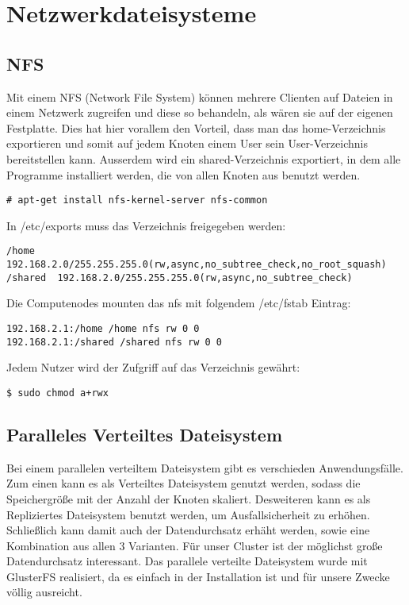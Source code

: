 \chapter{Netzwerkdateisysteme}
\section{NFS}
Mit einem NFS (Network File System) können mehrere Clienten auf Dateien
in einem Netzwerk zugreifen und diese so behandeln, als wären sie
auf der eigenen Festplatte.
Dies hat hier vorallem den Vorteil, dass man das home-Verzeichnis
exportieren und somit auf jedem Knoten einem User sein User-Verzeichnis
bereitstellen kann. Ausserdem wird ein shared-Verzeichnis exportiert, in dem 
alle Programme installiert werden, die von allen Knoten aus benutzt werden.
\begin{lstlisting}[style=Bash]
# apt-get install nfs-kernel-server nfs-common
\end{lstlisting}
In /etc/exports muss das Verzeichnis freigegeben werden:
\begin{lstlisting}[style=Bash,basicstyle=\small]
/home    192.168.2.0/255.255.255.0(rw,async,no_subtree_check,no_root_squash)
/shared  192.168.2.0/255.255.255.0(rw,async,no_subtree_check)
\end{lstlisting}
Die Computenodes mounten das nfs mit folgendem /etc/fstab Eintrag:
\begin{lstlisting}[style=Bash]
192.168.2.1:/home /home nfs rw 0 0
192.168.2.1:/shared /shared nfs rw 0 0
\end{lstlisting}
Jedem Nutzer wird der Zufgriff auf das Verzeichnis gewährt:
\begin{lstlisting}[style=Bash]
$ sudo chmod a+rwx
\end{lstlisting}
\section{Paralleles Verteiltes Dateisystem}
Bei einem parallelen verteiltem Dateisystem gibt es verschieden Anwendungsfälle.
Zum einen kann es als Verteiltes Dateisystem genutzt werden,
sodass die Speichergröße mit der Anzahl der Knoten skaliert.
Desweiteren kann es als Repliziertes Dateisystem benutzt werden,
um Ausfallsicherheit zu erhöhen.
Schließlich kann damit auch der Datendurchsatz erhäht werden, sowie eine Kombination aus allen 3 Varianten.
Für unser Cluster ist der möglichst große Datendurchsatz interessant.
Das parallele verteilte Dateisystem wurde mit GlusterFS realisiert,
da es einfach in der Installation ist und für unsere Zwecke völlig ausreicht.\\

